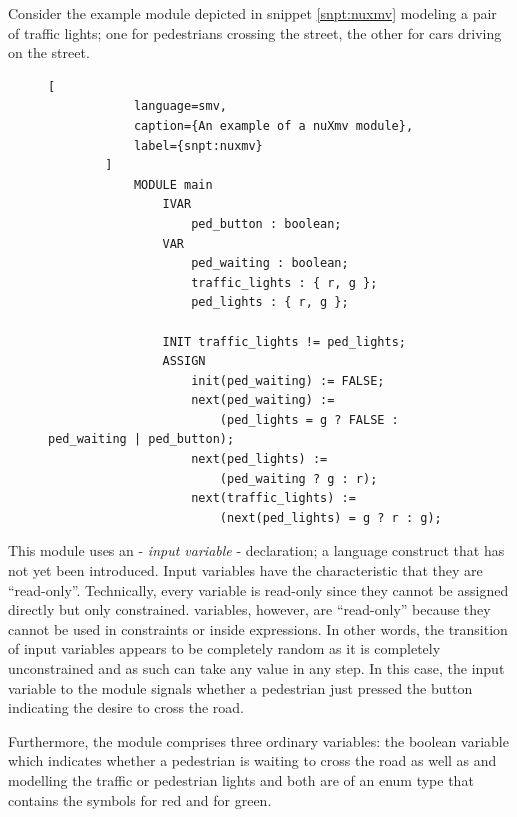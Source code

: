 \begin{example}
    Consider the example module depicted in snippet \ref{snpt:nuxmv} modeling a pair of traffic lights; one for pedestrians crossing the street, the other for cars driving on the street.

    \begin{figure}
        \begin{lstlisting}[
            language=smv,
            caption={An example of a nuXmv module},
            label={snpt:nuxmv}
        ]
            MODULE main
                IVAR
                    ped_button : boolean;
                VAR
                    ped_waiting : boolean;
                    traffic_lights : { r, g };
                    ped_lights : { r, g };

                INIT traffic_lights != ped_lights;
                ASSIGN
                    init(ped_waiting) := FALSE;
                    next(ped_waiting) :=
                        (ped_lights = g ? FALSE : ped_waiting | ped_button);
                    next(ped_lights) :=
                        (ped_waiting ? g : r);
                    next(traffic_lights) :=
                        (next(ped_lights) = g ? r : g);
        \end{lstlisting}
    \end{figure}

    This module uses an  - \textit{input variable} - declaration; a language construct that has not yet been introduced.
    Input variables have the characteristic that they are \enquote{read-only}.
    Technically, every variable is read-only since they cannot be assigned directly but only constrained.
     variables, however, are \enquote{read-only} because they cannot be used in  constraints or inside  expressions.
    In other words, the transition of input variables appears to be completely random as it is completely unconstrained and as such can take any value in any step.
    In this case, the input variable to the module signals whether a pedestrian just pressed the button indicating the desire to cross the road.

    Furthermore, the module comprises three ordinary variables: the boolean variable  which indicates whether a pedestrian is waiting to cross the road as well as  and  modelling the traffic or pedestrian lights and both are of an enum type that contains the symbols  for red and  for green.


\end{example}
